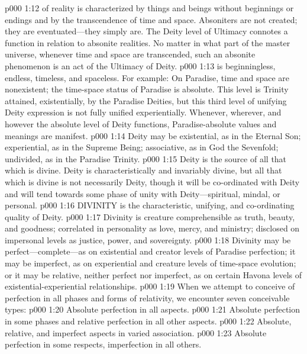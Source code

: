 \pc \vs p000 1:12  of reality is characterized by things and beings without beginnings or endings and by the transcendence of time and space. Absoniters are not created; they are eventuated---they simply are. The Deity level of Ultimacy connotes a function in relation to absonite realities. No matter in what part of the master universe, whenever time and space are transcended, such an absonite phenomenon is an act of the Ultimacy of Deity.
\pc \vs p000 1:13  is beginningless, endless, timeless, and spaceless. For example: On Paradise, time and space are nonexistent; the time\hyp{}space status of Paradise is absolute. This level is Trinity attained, existentially, by the Paradise Deities, but this third level of unifying Deity expression is not fully unified experientially. Whenever, wherever, and however the absolute level of Deity functions, Paradise\hyp{}absolute values and meanings are manifest.
\pc \vs p000 1:14 Deity may be existential, as in the Eternal Son; experiential, as in the Supreme Being; associative, as in God the Sevenfold; undivided, as in the Paradise Trinity.
\vs p000 1:15 Deity is the source of all that which is divine. Deity is characteristically and invariably divine, but all that which is divine is not necessarily Deity, though it will be co\hyp{}ordinated with Deity and will tend towards some phase of unity with Deity---spiritual, mindal, or personal.
\pc \vs p000 1:16 DIVINITY is the characteristic, unifying, and co\hyp{}ordinating quality of Deity.
\vs p000 1:17 Divinity is creature comprehensible as truth, beauty, and goodness; correlated in personality as love, mercy, and ministry; disclosed on impersonal levels as justice, power, and sovereignty.
\vs p000 1:18 Divinity may be perfect---complete---as on existential and creator levels of Paradise perfection; it may be imperfect, as on experiential and creature levels of time\hyp{}space evolution; or it may be relative, neither perfect nor imperfect, as on certain Havona levels of existential\hyp{}experiential relationships.
\pc \vs p000 1:19 When we attempt to conceive of perfection in all phases and forms of relativity, we encounter seven conceivable types:
\pc \vs p000 1:20 \bibnobreakspace Absolute perfection in all aspects.
\vs p000 1:21 \bibnobreakspace Absolute perfection in some phases and relative perfection in all other aspects.\plusone
\vs p000 1:22 \bibnobreakspace Absolute, relative, and imperfect aspects in varied association.
\vs p000 1:23 \bibnobreakspace Absolute perfection in some respects, imperfection in all others.
